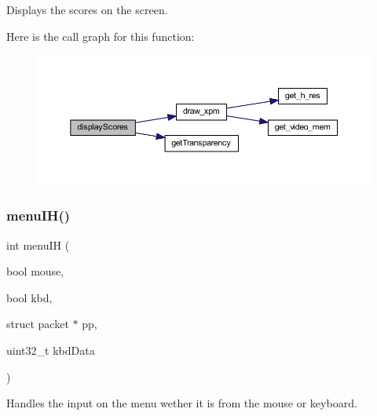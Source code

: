 Displays the scores on the screen. 

Here is the call graph for this function\+:
\nopagebreak
\begin{figure}[H]
\begin{center}
\leavevmode
\includegraphics[width=350pt]{group__menu_ga4e67dd36352ce9409d1994cad2553089_cgraph}
\end{center}
\end{figure}
\mbox{\label{group__menu_ga1c459dc7e822e8e658b11c66508d79f1}} 
\subsubsection{\texorpdfstring{menuIH()}{menuIH()}}
{\footnotesize\ttfamily int menu\+IH (\begin{DoxyParamCaption}\item[{bool}]{mouse,  }\item[{bool}]{kbd,  }\item[{struct packet $\ast$}]{pp,  }\item[{uint32\+\_\+t}]{kbd\+Data }\end{DoxyParamCaption})}



Handles the input on the menu wether it is from the mouse or keyboard. 


